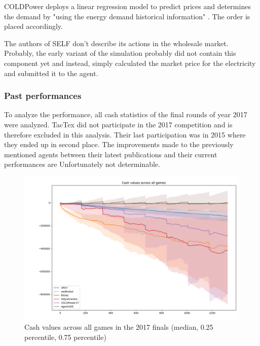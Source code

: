 COLDPower deploys a linear regression model to predict prices and determines the demand by "using the energy demand
historical information" \cite[]{cuevas2015distributed}. The order is placed accordingly.

The authors of \ac{SELF} don't describe its actions in the wholesale market. Probably, the early variant of the
simulation probably did not contain this component yet and instead, simply calculated the market price for the
electricity and submitted it to the agent.


\subsubsection{Past performances}%
\label{ssub:past_performances}

To analyze the performance, all cash statistics of the final rounds of year 2017 were analyzed. TacTex did not
participate in the 2017 competition and is therefore excluded in this analysis. Their last participation was in 2015
where they ended up in second place. The improvements made to the previously mentioned agents between their latest
publications and their current performances are Unfortunately not determinable.
\begin{figure}[]
    \centering
    \includegraphics[width=1.0\linewidth]{img/cash_vals_across_games.png}
    \caption{Cash values across all games in the 2017 finals (median, 0.25 percentile, 0.75 percentile)}
    \label{fig:cash_vals_across_games}
\end{figure}

